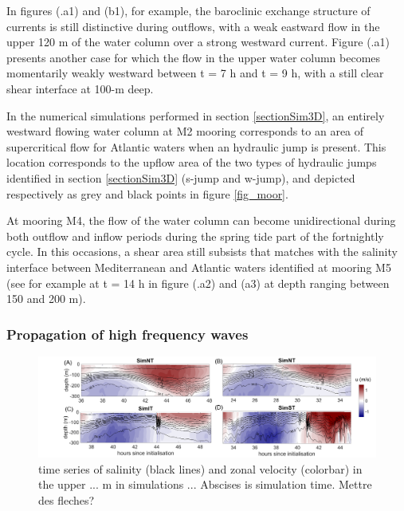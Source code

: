 In figures (.a1) and (b1), for example, the baroclinic exchange structure of currents is still distinctive during outflows, with a weak eastward flow in the upper 120 m of the water column over a strong westward current. Figure (.a1) presents another case for which the flow in the upper water column becomes momentarily weakly westward between t = 7 h and t = 9 h, with a still clear shear interface at 100-m deep.

In the numerical simulations performed in section \ref{sectionSim3D}, an entirely westward flowing water column at M2  \color{blue}mooring \color{black} corresponds to an area of supercritical flow for Atlantic waters when an hydraulic jump is present. This location corresponds to the upflow area of the two types of hydraulic jumps identified in section \ref{sectionSim3D} (s-jump and w-jump), and depicted respectively as grey and black points in figure \ref{fig_moor}.


At mooring M4, the flow of the water column can become unidirectional during both outflow and inflow periods during the spring tide part of the fortnightly cycle. In this occasions, a shear area still subsists that matches with the salinity interface between Mediterranean and Atlantic waters identified at mooring M5 (see for example at t = 14 h in figure (.a2) and (a3) at depth ranging between 150 and 200 m).

\subsubsection{Propagation of high frequency waves}

\begin{figure}[!h]
 \includegraphics[width=\textwidth]{./GBR3D/US_M4SimMIV.png}
 \caption {time series of salinity (black lines) and zonal velocity (colorbar)  \color{green}in the upper ... m in simulations ... Abscises is simulation time. Mettre des fleches? \color{black}}
 \label{Fig_moor_USs}
\end{figure}

